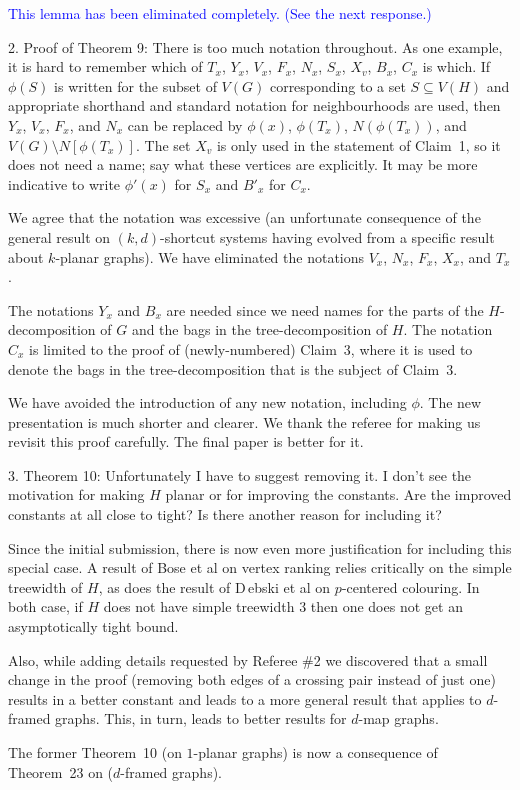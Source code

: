 \documentclass[12pt]{article}
\newenvironment{response}{\color{blue}}{}
\begin{document}
\textcolor{blue}{This lemma has been eliminated completely. (See the next response.)}

2. Proof of Theorem 9: There is too much notation throughout. As
one example, it is hard to remember which of $T_x$, $Y_x$, $V_x$, $F_x$, $N_x$,
$S_x$, $X_v$, $B_x$, $C_x$ is which. If $\phi(S)$ is written for the subset of $V(G)$
corresponding to a set $S \subseteq V(H)$ and appropriate shorthand and
standard notation for neighbourhoods are used, then $Y_x$, $V_x$, $F_x$, and
$N_x$ can be replaced by $\phi(x)$, $\phi(T_x)$, $N(\phi(T_x))$, and $V(G) \setminus N[\phi(T_x)]$.
The set $X_v$ is only used in the statement of Claim~1, so it does not
need a name; say what these vertices are explicitly. It may be more
indicative to write $\phi'(x)$ for $S_x$ and $B'_x$ for $C_x$.

\begin{response}
  We agree that the notation was excessive (an unfortunate consequence of the general result on $(k,d)$-shortcut systems having evolved from a specific result about $k$-planar graphs).  We have eliminated the notations $V_x$, $N_x$, $F_x$, $X_x$, and $T_x$.

  The notations $Y_x$ and $B_x$ are needed since we need names for the parts of the $H$-decomposition of $G$ and the bags in the tree-decomposition of $H$.    The notation $C_x$ is limited to the proof of (newly-numbered) Claim~3, where it is used to denote the bags in the tree-decomposition that is the subject of Claim~3.

  We have avoided the introduction of any new notation, including $\phi$.  The new presentation is much shorter and clearer.  We thank the referee for making us revisit this proof carefully.  The final paper is better for it.
\end{response}

3. Theorem 10: Unfortunately I have to suggest removing it. I don’t see
the motivation for making $H$ planar or for improving the constants.
Are the improved constants at all close to tight? Is there another
reason for including it?

\begin{response}
  Since the initial submission, there is now even more justification for including this special case.  A result of Bose et al on vertex ranking relies critically on the simple treewidth of $H$, as does the result of D\,ebski et al on $p$-centered colouring.  In both case, if $H$ does not have simple treewidth $3$ then one does not get an asymptotically tight bound.
  
  Also, while adding details requested by Referee \#2 we discovered that a small change in the proof (removing both edges of a crossing pair instead of just one) results in a better constant and leads to a more general result that applies to $d$-framed graphs. This, in turn, leads to better results for $d$-map graphs.
  
  The former Theorem~10 (on $1$-planar graphs) is now a consequence of  Theorem~23 on ($d$-framed graphs).
\end{response}
\end{document}
